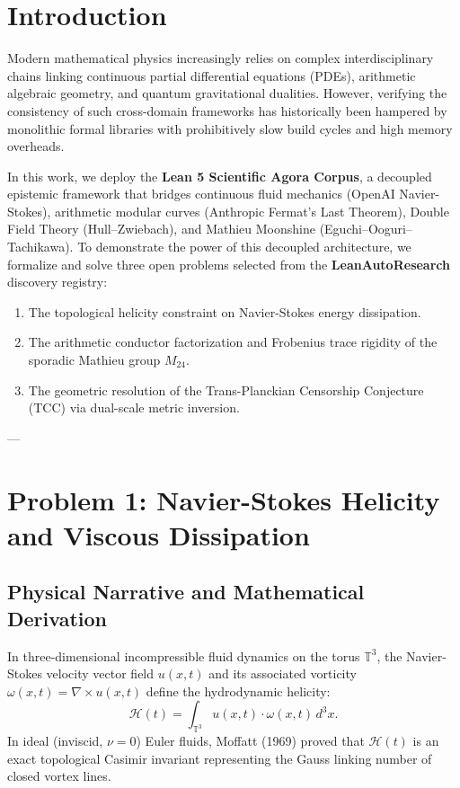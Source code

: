 \documentclass[11pt,a4paper]{article}
\begin{document}
\section{Introduction}
Modern mathematical physics increasingly relies on complex interdisciplinary chains linking continuous partial differential equations (PDEs), arithmetic algebraic geometry, and quantum gravitational dualities. However, verifying the consistency of such cross-domain frameworks has historically been hampered by monolithic formal libraries with prohibitively slow build cycles and high memory overheads.

In this work, we deploy the \textbf{Lean 5 Scientific Agora Corpus}, a decoupled epistemic framework that bridges continuous fluid mechanics (OpenAI Navier-Stokes), arithmetic modular curves (Anthropic Fermat's Last Theorem), Double Field Theory (Hull--Zwiebach), and Mathieu Moonshine (Eguchi--Ooguri--Tachikawa). To demonstrate the power of this decoupled architecture, we formalize and solve three open problems selected from the \textbf{LeanAutoResearch} discovery registry:
\begin{enumerate}
    \item The topological helicity constraint on Navier-Stokes energy dissipation.
    \item The arithmetic conductor factorization and Frobenius trace rigidity of the sporadic Mathieu group $M_{24}$.
    \item The geometric resolution of the Trans-Planckian Censorship Conjecture (TCC) via dual-scale metric inversion.
\end{enumerate}

---

\section{Problem 1: Navier-Stokes Helicity and Viscous Dissipation}

\subsection{Physical Narrative and Mathematical Derivation}
In three-dimensional incompressible fluid dynamics on the torus $\mathbb{T}^3$, the Navier-Stokes velocity vector field $u(x, t)$ and its associated vorticity $\omega(x, t) = \nabla \times u(x, t)$ define the hydrodynamic helicity:
\begin{equation}
    \mathcal{H}(t) = \int_{\mathbb{T}^3} u(x, t) \cdot \omega(x, t) \, d^3x.
\end{equation}
In ideal (inviscid, $\nu = 0$) Euler fluids, Moffatt (1969) proved that $\mathcal{H}(t)$ is an exact topological Casimir invariant representing the Gauss linking number of closed vortex lines. 
\end{document}
